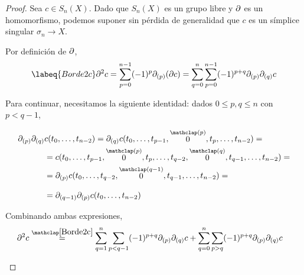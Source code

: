 \begin{proof}
Sea $c \in S_n(X)$. Dado que $S_n(X)$ es un grupo libre y $\partial$ es un
homomorfismo, podemos suponer sin pérdida de generalidad que $c$ es un símplice
singular $\sigma_n \to X$.

Por definición de $\partial$,
\begin{equation}
\labeq{Borde2c}
\p^2c=\sum^{n-1}_{p=0}(-1)^p\p_{(p)}(\p c)=
\sum^n_{q=0}\sum^{n-1}_{p=0}(-1)^{p+q}\p_{(p)}\p_{(q)}c
\end{equation}

Para continuar, necesitamos la siguiente identidad: dados $0 \leq p, q \leq n$
con $p < q-1$,

\begin{align*}
\p_{(p)}\p_{(q)}&c(t_0,\dots,t_{n-2})
	=\p_{(q)}c(t_0,\dots,t_{p-1},\arriba{(p)}{0},t_p,\dots,t_{n-2})=\\
	&=c(t_0,\dots,t_{p-1},\arriba{(p)}{0},t_p,\dots,t_{q-2},
	\arriba{(q)}{0},t_{q-1},\dots,t_{n-2})=\\
	&=\p_{(p)}c(t_0,\dots,t_{q-2},\arriba{(q-1)}{0},t_{q-1},\dots,t_{n-2})=\\[9pt]
	&=\p_{(q-1)}\p_{(p)}c(t_0,\dots,t_{n-2})
\end{align*}

Combinando ambas expresiones,
\begin{align*}
\p^2c
	&\arriba{\eqref{Borde2c}}{=}
	\sum_{q=1}^n\sum_{p < q-1}(-1)^{p+q}\p_{(p)}\p_{(q)}c+
	\sum^n_{q=0}\sum_{p > q}(-1)^{p+q}\p_{(p)}\p_{(q)}c
\end{align*}

\begin{marginfigure}
\end{marginfigure}
\end{proof}
